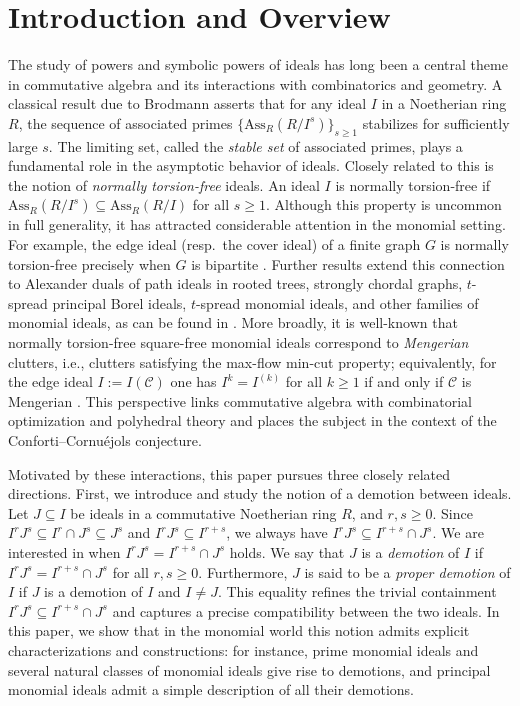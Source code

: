 \documentclass[11pt]{amsart}
\begin{document}
 
\section{Introduction and Overview}

The study of powers and symbolic powers of ideals has long been a central theme in commutative algebra and its interactions with combinatorics and geometry. A classical result due to Brodmann \cite{BR} asserts that for any ideal $I$ in a Noetherian ring $R$, the sequence of associated primes $\{\mathrm{Ass}_R(R/I^s)\}_{s\geq 1}$ stabilizes for sufficiently large $s$. The limiting set, called the \emph{stable set} of associated primes, plays a fundamental role in the asymptotic behavior of ideals. Closely related to this is the notion of \emph{normally torsion-free} ideals.  An ideal $I$ is normally torsion-free if $\mathrm{Ass}_R(R/I^s)\subseteq \mathrm{Ass}_R(R/I)$ for all $s\geq 1.$ 
Although this property is uncommon in full generality, it has attracted considerable attention in the monomial setting. For example, the edge ideal (resp.\ the cover ideal) of a finite graph $G$ is normally torsion-free precisely when $G$ is bipartite \cite{GRV,SVV}. Further results extend this connection to Alexander duals of path ideals in rooted trees, strongly chordal graphs, $t$-spread principal Borel ideals, $t$-spread monomial ideals, and other families of monomial ideals, as can be found in \cite{HN, KHN1, MNQ, N3, NQ, NQKR}. More broadly, it is well-known that normally torsion-free square-free monomial ideals correspond to \emph{Mengerian} clutters, i.e., clutters satisfying the max-flow min-cut property; equivalently, for the edge ideal $I:=I(\mathcal C)$ one has $I^k=I^{(k)}$ for all $k\ge1$ if and only if $\mathcal C$ is Mengerian \cite{V1}. This perspective links commutative algebra with combinatorial optimization and polyhedral theory and places the subject in the context of the Conforti–Cornu\'e{j}ols conjecture.

Motivated by these interactions, this paper pursues three closely related directions. First, we introduce and study the notion of a demotion between ideals. 
Let  $J \subseteq  I$ be ideals in a commutative Noetherian ring $R$, and $r,s\geq 0$. Since  $I^rJ^s \subseteq I^r\cap J^s \subseteq J^s$ and $I^rJ^s\subseteq I^{r+s}$, we always have  $I^rJ^s \subseteq I^{r+s} \cap J^s$. We are interested in when  $I^rJ^s=I^{r+s}\cap J^s$ holds. 
We say that  $J$ is  a \textit{demotion} of $I$ if
$I^rJ^s=I^{r+s}\cap J^s$ for all $r,s\geq 0$. Furthermore,  $J$  is said to be   a \textit{proper demotion} of $I$ if $J$ is a demotion of $I$ and $I\neq J$. 
This equality refines the trivial containment $I^rJ^s\subseteq I^{r+s}\cap J^s$ and captures a precise compatibility between the two ideals.
In this paper, we show that in the monomial world this notion admits explicit characterizations and constructions: for instance, prime monomial ideals and several natural classes of monomial ideals give rise to demotions, and principal monomial ideals admit a simple description of all their demotions. 
\end{document}
